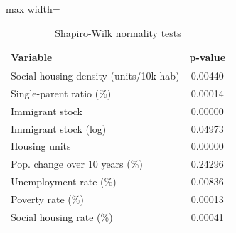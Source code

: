 \begin{table}[ht]
\centering
\caption{Shapiro-Wilk normality tests} 
\label{tab:normality}
\begin{adjustbox}{max width=\linewidth}
\begin{tabular}{lc}
  \toprule
Variable & p-value \\ 
  \midrule
  Social housing density (units/10k hab) & 0.00440 \\ 
  Single-parent ratio (\%) & 0.00014 \\ 
  Immigrant stock & 0.00000 \\ 
  Immigrant stock (log) & 0.04973 \\ 
  Housing units & 0.00000 \\ 
  Pop. change over 10 years (\%) & 0.24296 \\ 
  Unemployment rate (\%) & 0.00836 \\ 
  Poverty rate (\%) & 0.00013 \\ 
  Social housing rate (\%) & 0.00041 \\ 
   \bottomrule
\end{tabular}
\end{adjustbox}
\end{table}